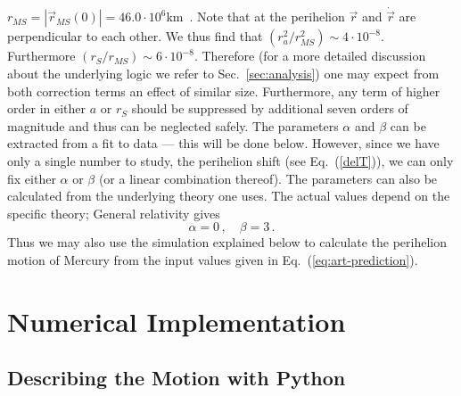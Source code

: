 \documentclass[12pt,ngerman,american]{iopart}
\newcommand{\abs}[1]{\left\vert #1 \right\vert}
\begin{document}
$ r_{MS}=\abs{\vec r_{MS}(0)} = 46.0 \cdot 10^6$km~\cite{MercuryFactSheet}. Note that at the perihelion $\vec r$ and $\dot{\vec r}$ are perpendicular to each other.
We thus find that $(r_a^2/ r_{MS}^2) \sim 4\cdot10^{-8}$. Furthermore $(r_S/r_{MS})\sim6\cdot 10^{-8}$.
Therefore (for a more detailed discussion about the underlying logic we refer to Sec.~\ref{sec:analysis}) one may expect from both correction terms an effect of similar size. Furthermore, any term of higher order in either $a$ or $r_S$
should be suppressed by additional seven orders of magnitude and thus can be neglected safely.
The parameters $\alpha$ and $\beta$ can be extracted from a fit to data --- this will be done below.
However, since we have only a single number to study, the perihelion shift (see Eq.~(\ref{delT})),
we can only fix either $\alpha$ or $\beta$ (or a linear combination thereof).
The parameters can also be calculated from the underlying theory one uses. The actual values depend on the specific theory;
General relativity gives~\cite{Einstein}
\begin{equation}
	\alpha = 0 \, , \quad \beta = 3 \, . \label{eq:art-prediction}
\end{equation}
Thus we may also use the simulation explained below to calculate the perihelion motion of Mercury from the input
values given in Eq.~(\ref{eq:art-prediction}).





\section{Numerical Implementation}\label{sec:Numerical Implementation}

\subsection{Describing the Motion with Python}
\end{document}
